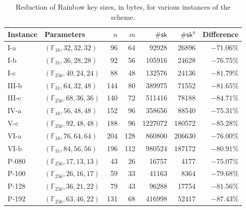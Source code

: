 \documentclass[english]{ufsc-thesis-rn46-2019/ufsc-thesis-rn46-2019}
\theoremstyle{definition}
\begin{document}
\begin{table}[htbp]
  \renewcommand{\arraystretch}{1.2}
  \setlength{\tabcolsep}{6.5pt}
  \centering
  \caption{Reduction of Rainbow key sizes, in bytes, for various instances of
    the scheme.}\label{tab:eta-diff}
  \begin{tabular}{*{2}{l}*{5}{r}}
    \toprule
    Instance & Parameters                       & $n$ & $m$ & $\#\mathsf{sk}$
      & $\#\mathsf{sk}^{\eta}$ & Difference \\
    \midrule
    I-a      & $(\mathbb{F}_{ 16}, 32, 32, 32)$ & 96  & 64  &  \num{   92928}
      &          \num{  26896} & $-71.06\%$ \\
    I-b      & $(\mathbb{F}_{ 31}, 36, 28, 28)$ & 92  & 56  &  \num{  105916}
      &          \num{  24628} & $-76.75\%$ \\
    I-c      & $(\mathbb{F}_{256}, 40, 24, 24)$ & 88  & 48  &  \num{  132576}
      &          \num{  24136} & $-81.79\%$ \\
    III-b    & $(\mathbb{F}_{ 31}, 64, 32, 48)$ & 144 & 80  &  \num{  389975}
      &          \num{  71552} & $-81.65\%$ \\
    III-c    & $(\mathbb{F}_{256}, 68, 36, 36)$ & 140 & 72  &  \num{  511416}
      &          \num{  78188} & $-84.71\%$ \\
    IV-a     & $(\mathbb{F}_{ 16}, 56, 48, 48)$ & 152 & 96  &  \num{  358656}
      &          \num{  88540} & $-75.31\%$ \\
    V-c      & $(\mathbb{F}_{256}, 92, 48, 48)$ & 188 & 96  &  \num{ 1227072}
      &          \num{ 180572} & $-85.28\%$ \\
    VI-a     & $(\mathbb{F}_{ 16}, 76, 64, 64)$ & 204 & 128 &  \num{  860800}
      &          \num{ 206630} & $-76.00\%$ \\
    VI-b     & $(\mathbb{F}_{ 31}, 84, 56, 56)$ & 196 & 112 &  \num{  980524}
      &          \num{ 187172} & $-80.91\%$ \\
    P-080    & $(\mathbb{F}_{256}, 17, 13, 13)$ & 43  & 26  &  \num{   16757}
      &          \num{   4177} & $-75.07\%$ \\
    P-100    & $(\mathbb{F}_{256}, 26, 16, 17)$ & 59  & 33  &  \num{   41163}
      &          \num{   8364} & $-79.68\%$ \\
    P-128    & $(\mathbb{F}_{256}, 36, 21, 22)$ & 79  & 43  &  \num{   96288}
      &          \num{  17754} & $-81.56\%$ \\
    P-192    & $(\mathbb{F}_{256}, 63, 46, 22)$ & 131 & 68  &  \num{  416998}
      &          \num{  52417} & $-87.43\%$ \\

\end{tabular}
\end{table}
\end{document}
